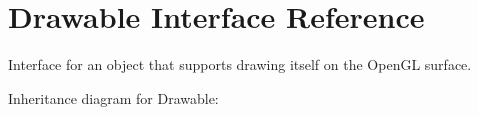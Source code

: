 \section{Drawable Interface Reference}
\label{interfaceunitingtwist_1_1_drawable}


Interface for an object that supports drawing itself on the Open\+GL surface.  




Inheritance diagram for Drawable\+:
